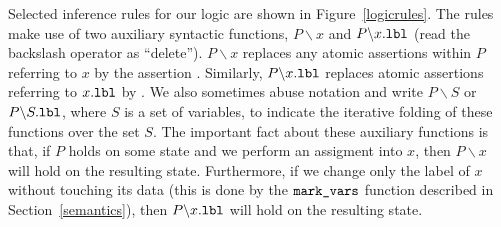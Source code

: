Selected inference rules for our logic are shown in Figure~\ref{logicrules}. The rules make use of
two auxiliary syntactic functions, $P \backslash x$ and $P \backslash x.\text{\tt{lbl}}$ (read the backslash
operator as ``delete''). $P \backslash x$
replaces any atomic assertions within $P$ referring to $x$ by the assertion . Similarly,
$P \backslash x.\text{\tt{lbl}}$ replaces atomic assertions referring to $x.\text{\tt{lbl}}$ by .
We also sometimes abuse notation and write $P \backslash S$ or $P \backslash S.\text{\tt{lbl}}$, where
$S$ is a set of variables, to indicate the iterative folding of these functions over the set
$S$. The important fact about these auxiliary functions is that, if $P$ holds on some state
and we perform an assigment into $x$, then $P \backslash x$ will hold on the resulting state.
Furthermore, if we change only the label of $x$ without touching its data (this is done by
the $\text{\tt{mark\_vars}}$ function described in Section~\ref{semantics}), then 
$P \backslash x.\text{\tt{lbl}}$ will hold on the resulting state.

